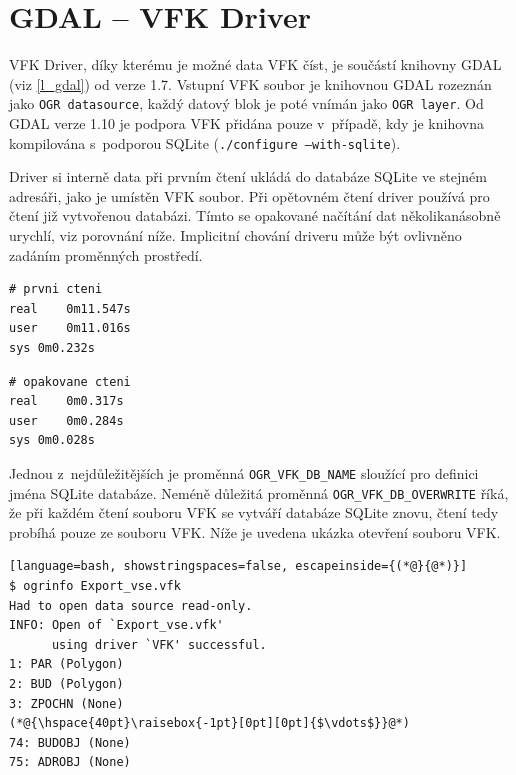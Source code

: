 \documentclass[a4paper,12pt,oneside]{book}
\begin{document}
\newpage
\section{GDAL -- VFK Driver}
VFK Driver, díky kterému je možné data VFK číst, je součástí knihovny
GDAL (viz \ref{l_gdal}) od verze 1.7. Vstupní VFK soubor je knihovnou
GDAL rozeznán jako \texttt{OGR datasource}, každý datový blok je poté
vnímán jako \texttt{OGR layer}. Od GDAL verze 1.10 je podpora VFK
přidána pouze v~případě, kdy je knihovna kompilována s~podporou SQLite
(\texttt{./configure --with-sqlite}).

Driver si interně data při prvním čtení ukládá do databáze SQLite ve
stejném adresáři, jako je umístěn VFK soubor. Při opětovném čtení
driver používá pro čtení již vytvořenou databázi. Tímto se opakované
načítání dat několikanásobně urychlí, viz porovnání níže. Implicitní
chování driveru může být ovlivněno zadáním proměnných prostředí.

\begin{multicols}{2}
\begin{lstlisting}
# prvni cteni
real	0m11.547s
user	0m11.016s
sys	0m0.232s
\end{lstlisting}
\columnbreak
\begin{lstlisting}
# opakovane cteni
real	0m0.317s
user	0m0.284s
sys	0m0.028s
\end{lstlisting}
\end{multicols}

Jednou z~nejdůležitějších je proměnná \texttt{OGR\_VFK\_DB\_NAME}
sloužící pro definici jména SQLite databáze. Neméně důležitá proměnná
\texttt{OGR\_VFK\_DB\_OVERWRITE} říká, že při každém čtení souboru VFK
se vytváří databáze SQLite znovu, čtení tedy probíhá pouze ze
souboru VFK. Níže je uvedena ukázka otevření souboru VFK. \cite{gdal_vfk}

\begin{lstlisting}[language=bash, showstringspaces=false, escapeinside={(*@}{@*)}]
$ ogrinfo Export_vse.vfk
Had to open data source read-only.
INFO: Open of `Export_vse.vfk'
      using driver `VFK' successful.
1: PAR (Polygon)
2: BUD (Polygon)
3: ZPOCHN (None)
(*@{\hspace{40pt}\raisebox{-1pt}[0pt][0pt]{$\vdots$}}@*)
74: BUDOBJ (None)
75: ADROBJ (None) 
\end{lstlisting}
\end{document}
